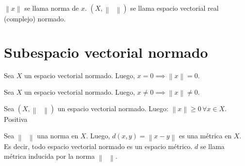 \begin{definition}
    \begin{math}
        \left\|
        x
        \right\|
    \end{math}
    se llama norma de $x$.
    \begin{math}
        \left(
        X,
        \left\|
        \phantom{\cdot}
        \right\|
        \right)
    \end{math}
    se llama espacio vectorial real (complejo) normado.
\end{definition}

\section{Subespacio vectorial normado}

\begin{prob}
    \label{prob1}
    Sea $X$ un espacio vectorial normado.
    Luego,
    \begin{math}
        x=
        0\implies
        \left\|
        x
        \right\|=
        0
    \end{math}.
\end{prob}

\begin{prob}
    \label{prob2}
    Sea $X$ un espacio vectorial normado.
    Luego,
    \begin{math}
        x\neq
        0\implies
        \left\|
        x
        \right\|\neq
        0
    \end{math}.
\end{prob}

\begin{prob}
    \label{prob3}
    Sea
    \begin{math}
        \left(
        X,
        \left\|
        \phantom{\cdot}
        \right\|
        \right)
    \end{math}
    un espacio vectorial normado.
    Luego:
    \begin{math}
        \left\|
        x
        \right\|\geq
        0\,
        \forall x\in X
    \end{math}.
    \hfill
    Positiva
\end{prob}

\begin{prob}
    \label{prob4}
    Sea
    \begin{math}
        \left\|
        \phantom{\cdot}
        \right\|
    \end{math}
    una norma en $X$.
    Luego,
    \begin{math}
        d\left(x,y\right)=
        \left\|
        x-y
        \right\|
    \end{math}
    es una métrica en $X$.
    Es decir, todo espacio vectorial normado es un espacio
    métrico.
    $d$ se llama métrica inducida por la norma
    \begin{math}
        \left\|
        \phantom{\cdot}
        \right\|
    \end{math}.
\end{prob}


